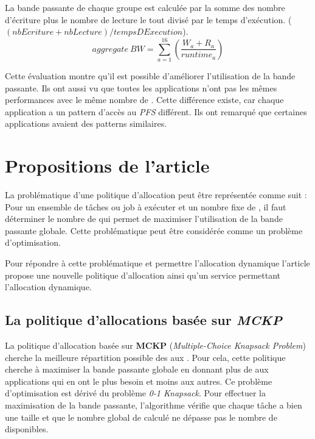 \documentclass[10pt, a4paper]{article}
\begin{document}
La bande passante de chaque groupe est calculée par la somme des nombre d'écriture plus le nombre de lecture le tout divisé par le temps d'exécution. ($(nbEcriture + nbLecture) / tempsDExecution$).
\begin{equation*}aggregate\ BW=\sum_{a=1}^{16}\left(\frac{W_{a}+R_{a}}{runtime_{a}}\right)\end{equation*}

Cette évaluation montre qu'il est possible d'améliorer l'utilisation de la bande passante.
Ils ont aussi vu que toutes les applications n'ont pas les mêmes performances avec le même nombre de \noeudsIO{}. Cette différence existe, car chaque application a un pattern d'accès au \emph{PFS} différent. Ils ont remarqué que certaines applications avaient des patterns similaires.

\section{Propositions de l'article}

La problématique d'une politique d'allocation peut être représentée comme suit :
Pour un ensemble de tâches ou job à exécuter et un nombre fixe de \noeudsIO{}, il faut déterminer le nombre de \noeudsIOforwarding{} qui permet de maximiser l'utilisation de la bande passante globale.
Cette problématique peut être considérée comme un problème d'optimisation.

Pour répondre à cette problématique et permettre l'allocation dynamique l'article propose une nouvelle politique d'allocation ainsi qu'un service permettant l'allocation dynamique.

\subsection{La politique d'allocations basée sur \emph{MCKP}}

La politique d'allocation basée sur \textbf{MCKP} (\emph{Multiple-Choice Knapsack Problem}) cherche la meilleure répartition possible des \noeudsIOforwarding{} aux \noeudsDeCalculs{}.
Pour cela, cette politique cherche à maximiser la bande passante globale en donnant plus de \noeudsIOforwarding{} aux applications qui en ont le plus besoin et moins aux autres. Ce problème d'optimisation est dérivé du problème \emph{0-1 Knapsack}.
Pour effectuer la maximisation de la bande passante, l'algorithme vérifie que chaque tâche a bien une taille et que le nombre global de \noeudsIOforwarding{} calculé ne dépasse pas le nombre de \noeudsIO{} disponibles.
\end{document}
